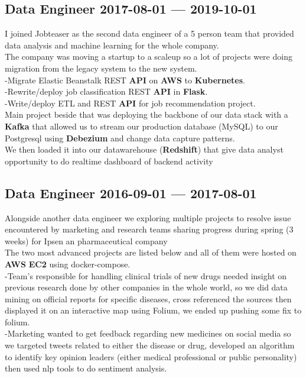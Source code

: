 \documentclass[10pt]{article}
\begin{document}
\subsection{{Data Engineer \hspace*{\fill} 2017-08-01 --- 2019-10-01}}
\smallskip
{}
\medskip
I joined Jobteaser as the second data engineer of a 5 person team that provided data analysis and machine learning for the whole company.\\
            The company was moving a startup to a scaleup so a lot of projects were doing migration from the legacy system to the new system.\\
            -Migrate Elastic Beanstalk REST \textbf{API} on \textbf{AWS} to \textbf{Kubernetes}.\\
            -Rewrite/deploy job classification REST \textbf{API} in \textbf{Flask}.\\
            -Write/deploy ETL and REST \textbf{API} for job recommendation project.\\
            Main project beside that was deploying the backbone of our data stack with a \textbf{Kafka} that allowed us to  stream our production database (MySQL) to our Postgresql using \textbf{Debezium} and change data capture patterns.\\
            We then loaded it into our datawarehouse (\textbf{Redshift}) that give data analyst opportunity to do realtime dashboard of backend activity
\medskip

\subsection{{Data Engineer \hspace*{\fill} 2016-09-01 --- 2017-08-01}}
\smallskip
{}
\medskip
Alongside another data engineer we exploring multiple projects to resolve issue encountered by marketing and research teams sharing progress during spring (3 weeks) for Ipsen an pharmaceutical company\\
            The two most advanced projects are listed below and all of them were hosted on \textbf{AWS} \textbf{EC2} using docker-compose.\\
            -Team's responsible for handling clinical trials of new drugs needed insight on previous research done by other companies in the whole world, so we did data mining on official reports for specific diseases, cross referenced the sources then displayed it on an interactive map using Folium, we ended up pushing some fix to folium.\\
            -Marketing wanted to get feedback regarding new medicines on social media so we targeted tweets related to either the disease or drug,  developed an algorithm to identify key opinion leaders (either medical professional or public personality) then used nlp tools to do sentiment analysis.\\
\medskip
\end{document}
